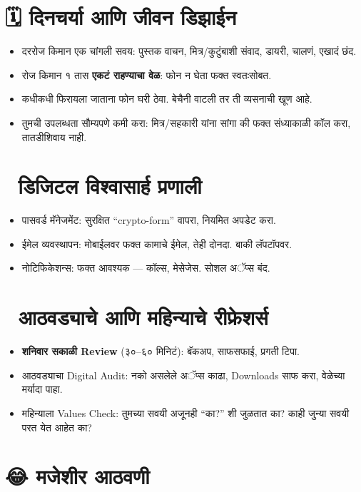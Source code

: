 \section*{🗓️ दिनचर्या आणि जीवन डिझाईन}

\begin{itemize}
  \item दररोज किमान एक चांगली सवय: पुस्तक वाचन, मित्र/कुटुंबाशी संवाद, डायरी, चालणं, एखादं छंद.  
  \item रोज किमान १ तास \textbf{एकटं राहण्याचा वेळ}: फोन न घेता फक्त स्वतःसोबत.  
  \item कधीकधी फिरायला जाताना फोन घरी ठेवा. बेचैनी वाटली तर ती व्यसनाची खूण आहे.  
  \item तुमची उपलब्धता सौम्यपणे कमी करा: मित्र/सहकारी यांना सांगा की फक्त संध्याकाळी कॉल करा, तातडीशिवाय नाही.  
\end{itemize}

\section*{🧠 डिजिटल विश्वासार्ह प्रणाली}

\begin{itemize}
  \item पासवर्ड मॅनेजमेंट: सुरक्षित “crypto-form” वापरा, नियमित अपडेट करा.  
  \item ईमेल व्यवस्थापन: मोबाईलवर फक्त कामाचे ईमेल, तेही दोनदा. बाकी लॅपटॉपवर.  
  \item नोटिफिकेशन्स: फक्त आवश्यक — कॉल्स, मेसेजेस. सोशल अॅप्स बंद.  
\end{itemize}

\section*{📅 आठवड्याचे आणि महिन्याचे रीफ्रेशर्स}

\begin{itemize}
  \item \textbf{शनिवार सकाळी Review} (३०–६० मिनिटं): बॅकअप, साफसफाई, प्रगती टिपा.  
  \item आठवड्याचा Digital Audit: नको असलेले अॅप्स काढा, Downloads साफ करा, वेळेच्या मर्यादा पाहा.  
  \item महिन्याला Values Check: तुमच्या सवयी अजूनही “का?” शी जुळतात का? काही जुन्या सवयी परत येत आहेत का?  
\end{itemize}

\section*{😂 मजेशीर आठवणी}

